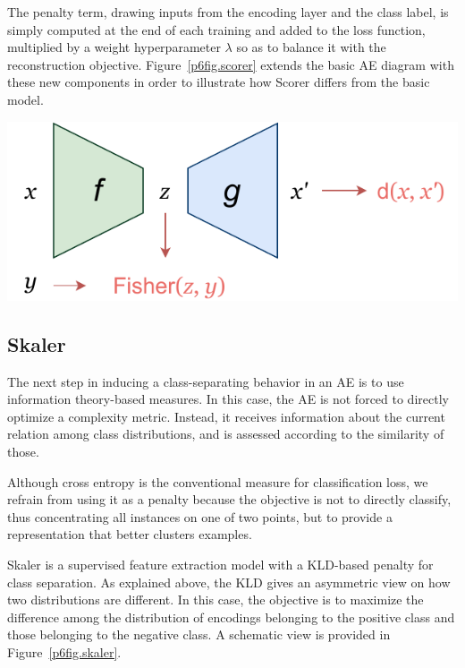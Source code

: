 The penalty term, drawing inputs from the encoding layer and the class label, is simply computed at the end of each training and added to the loss function, multiplied by a weight hyperparameter $\lambda$ so as to balance it with the reconstruction objective. Figure~\ref{p6fig.scorer} extends the basic AE diagram with these new components in order to illustrate how Scorer differs from the basic model.


\begin{marginfigure}
  \centering
  \includegraphics[width=\linewidth]{scorer.pdf}
  \caption[Schematic illustration of the Scorer model.]{\label{p6fig.scorer}}
\end{marginfigure}


\subsection{Skaler}

The next step in inducing a class-separating behavior in an AE is to use information theory-based measures. In this case, the AE is not forced to directly optimize a complexity metric. Instead, it receives information about the current relation among class distributions, and is assessed according to the similarity of those.

Although cross entropy is the conventional measure for classification loss, we refrain from using it as a penalty because the objective is not to directly classify, thus concentrating all instances on one of two points, but to provide a representation that better clusters examples.

Skaler is a supervised feature extraction model with a KLD-based penalty for class separation. As explained above, the KLD gives an asymmetric view on how two distributions are different. In this case, the objective is to maximize the difference among the distribution of encodings belonging to the positive class and those belonging to the negative class. A schematic view is provided in Figure~\ref{p6fig.skaler}.

